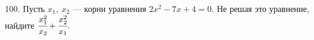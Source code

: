 100. Пусть $x_1,\ x_2$ --- корни уравнения $2x^2-7x+4=0.$ Не решая это уравнение, найдите $\cfrac{x_1^2}{x_2}+\cfrac{x_2^2}{x_1}.$\\
